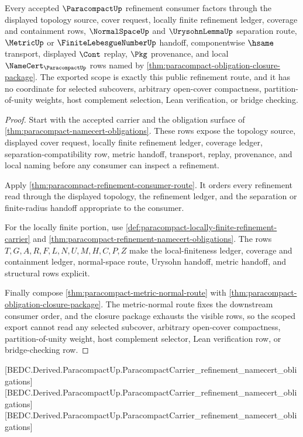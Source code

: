 \begin{theorem}
\label{thm:paracompact-scoped-refinement-export}
Every accepted $\ParacompactUp$ refinement consumer factors through the displayed topology source, cover request, locally finite refinement ledger, coverage and containment rows, $\NormalSpaceUp$ and $\UrysohnLemmaUp$ separation route, $\MetricUp$ or $\FiniteLebesgueNumberUp$ handoff, componentwise $\hsame$ transport, displayed $\Cont$ replay, $\Pkg$ provenance, and local $\NameCert_{\ParacompactUp}$ rows named by \autoref{thm:paracompact-obligation-closure-package}. The exported scope is exactly this public refinement route, and it has no coordinate for selected subcovers, arbitrary open-cover compactness, partition-of-unity weights, host complement selection, Lean verification, or bridge checking.
\end{theorem}
\begin{proof}
Start with the accepted carrier and the obligation surface of \autoref{thm:paracompact-namecert-obligations}. These rows expose the topology source, displayed cover request, locally finite refinement ledger, coverage ledger, separation-compatibility row, metric handoff, transport, replay, provenance, and local naming before any consumer can inspect a refinement.

Apply \autoref{thm:paracompact-refinement-consumer-route}. It orders every refinement read through the displayed topology, the refinement ledger, and the separation or finite-radius handoff appropriate to the consumer.

For the locally finite portion, use \autoref{def:paracompact-locally-finite-refinement-carrier} and \autoref{thm:paracompact-refinement-namecert-obligations}. The rows $T,G,A,R,F,L,N,U,M,H,C,P,Z$ make the local-finiteness ledger, coverage and containment ledger, normal-space route, Urysohn handoff, metric handoff, and structural rows explicit.

Finally compose \autoref{thm:paracompact-metric-normal-route} with \autoref{thm:paracompact-obligation-closure-package}. The metric-normal route fixes the downstream consumer order, and the closure package exhausts the visible rows, so the scoped export cannot read any selected subcover, arbitrary open-cover compactness, partition-of-unity weight, host complement selector, Lean verification row, or bridge-checking row.
\end{proof}

[BEDC.Derived.ParacompactUp.ParacompactCarrier\_refinement\_namecert\_obligations]
[BEDC.Derived.ParacompactUp.ParacompactCarrier\_refinement\_namecert\_obligations]
[BEDC.Derived.ParacompactUp.ParacompactCarrier\_refinement\_namecert\_obligations]

